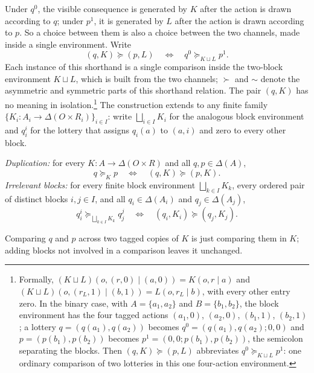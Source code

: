 \documentclass[11pt,a4paper]{article}
\theoremstyle{definition}
\newcommand{\D}{\Delta}
\newcommand{\1}{\mathbf 1}
\begin{document}
Under \(q^0\), the visible consequence is generated by \(K\) after the action is drawn according to \(q\); under \(p^1\), it is generated by \(L\) after the action is drawn according to \(p\). So a choice between them is
also a choice between the two channels, made inside a single environment.  %
Write
\[
 (q,K)\succeq(p,L)
 \quad\Longleftrightarrow\quad
 q^0\succeq_{K\sqcup L}p^1.
\]
Each instance of this shorthand is a single comparison inside the two-block environment $K\sqcup L$, which is
built from the two channels; $\succ$ and $\sim$ denote the asymmetric and symmetric parts of this shorthand
relation.  The pair $(q,K)$
has no meaning in isolation.\footnote{Formally, $(K\sqcup L)(o,(r,0)\mid(a,0))=K(o,r\mid a)$ and
$(K\sqcup L)(o,(r_L,1)\mid(b,1))=L(o,r_L\mid b)$, with every other entry zero.  In the binary case, with
$A=\{a_1,a_2\}$ and $B=\{b_1,b_2\}$, the block environment has the four tagged actions $(a_1,0)$, $(a_2,0)$,
$(b_1,1)$, $(b_2,1)$; a lottery $q=(q(a_1),q(a_2))$ becomes $q^0=(q(a_1),q(a_2);0,0)$ and $p=(p(b_1),p(b_2))$
becomes $p^1=(0,0;p(b_1),p(b_2))$, the semicolon separating the blocks.  Then $(q,K)\succeq(p,L)$ abbreviates
$q^0\succeq_{K\sqcup L}p^1$: one ordinary comparison of two lotteries in this one four-action environment.}  The construction extends to any finite family
$\{K_i:A_i\to\D(O\times R_i)\}_{i\in I}$: write $\bigsqcup_{i\in I}K_i$ for the analogous block environment and
$q_i^i$ for the lottery that assigns $q_i(a)$ to $(a,i)$ and zero to every other block.

\begin{description}[leftmargin=*,style=sameline]

\item[(A5) Block-comparison coherence.]
\emph{Duplication:} for every $K:A\to\D(O\times R)$ and all $q,p\in\D(A)$,
\[
 q\succeq_Kp
 \quad\Longleftrightarrow\quad
 (q,K)\succeq(p,K).
\]
\emph{Irrelevant blocks:} for every finite block environment $\bigsqcup_{k\in I}K_k$, every ordered pair of
distinct blocks $i,j\in I$, and all $q_i\in\D(A_i)$ and $q_j\in\D(A_j)$,
\[
 q_i^i\succeq_{\bigsqcup_{k\in I}K_k}q_j^j
 \quad\Longleftrightarrow\quad
 (q_i,K_i)\succeq(q_j,K_j).
\]

Comparing $q$ and $p$ across two tagged copies of $K$ is just comparing them in $K$; adding blocks not involved
in a comparison leaves it unchanged.

\end{description}
\end{document}
